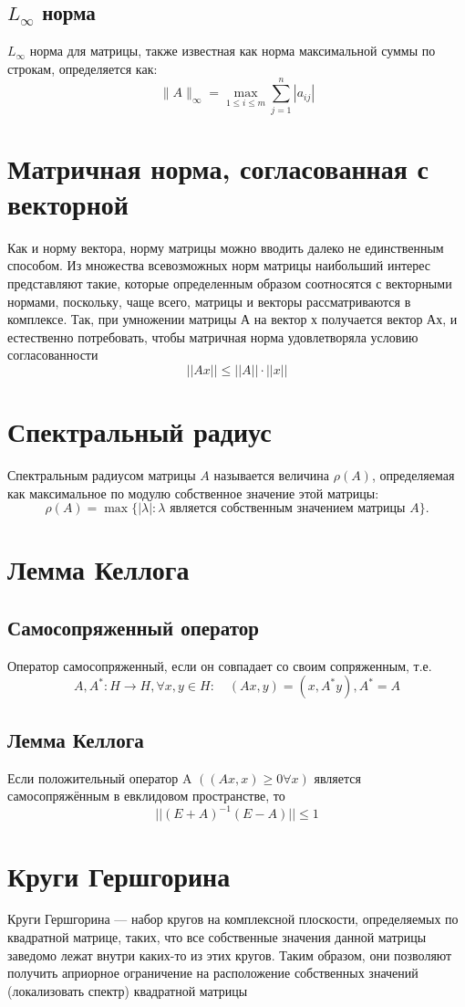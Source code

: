 \documentclass{article}
\begin{document}
\subsection{$L_\infty$ норма}
$L_\infty$ норма для матрицы, также известная как норма максимальной суммы по строкам, определяется как:
\[
\|A\|_\infty = \max_{1 \leq i \leq m} \sum_{j=1}^n |a_{ij}|
\]

\section{Матричная норма, согласованная с векторной}
Как и норму вектора, норму матрицы
можно вводить далеко не единственным способом. Из множества  
всевозможных норм матрицы наибольший интерес представляют такие, которые 
определенным образом соотносятся с векторными нормами, поскольку, 
чаще всего, матрицы и векторы рассматриваются в комплексе. Так, при 
умножении матрицы А на вектор х получается вектор Ах, и естественно 
потребовать, чтобы матричная норма удовлетворяла условию  
согласованности 
\[||Ax||\leq ||A|| \cdot ||x||\]
\section{Спектральный радиус}
Спектральным радиусом матрицы \(A\) называется величина \(\rho(A)\), определяемая как максимальное по модулю собственное значение этой матрицы:
\[ \rho(A) = \max \{ |\lambda| : \lambda \text{ является собственным значением матрицы } A \}. \]
\section{Лемма Келлога}

\subsection{Самосопряженный оператор}
Оператор самосопряженный, если он совпадает со своим сопряженным, т.е.
$$A, A^*: H \to H, \forall x, y \in H: \quad (Ax, y) = (x, A^* y), A^* = A$$
\subsection{Лемма Келлога}
Если положительный оператор A $((Ax, x) \geq 0 \forall x)$ является самосопряжённым в евклидовом пространстве, то 
$$||(E+A)^{-1}(E-A)||\leq 1$$
\section{Круги Гершгорина}
Круги Гершгорина — набор кругов на комплексной плоскости, определяемых по квадратной матрице, таких, что все собственные значения данной матрицы заведомо лежат внутри каких-то из этих кругов. Таким образом, они позволяют получить априорное ограничение на расположение собственных значений (локализовать спектр) квадратной матрицы
\end{document}
